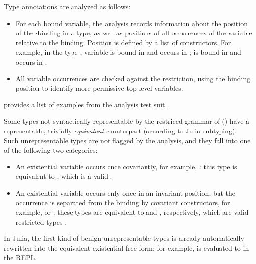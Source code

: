 Type annotations are analyzed as follows:
\begin{itemize}
  \item For each bound variable, the analysis records information about the
    position of the -binding in a type, as well as positions of all
    occurrences of the variable relative to the binding.
    Position is defined by a list of constructors.
    For example, in the type ,
    variable  is bound in \cjl{[]} and occurs in ;
     is bound in \cjl{[Tuple]} and occurs in \cjl{[]}.
  \item All variable occurrences are checked against the restriction,
    using the binding position to identify more permissive top-level variables.
\end{itemize}
 provides a list of examples from 
the analysis test suit.

Some types not syntactically representable by the restriced grammar of \ty
()
have a representable, trivially \emph{equivalent} counterpart (according
to Julia subtyping).
Such unrepresentable types are not flagged by the analysis, and they
fall into one of the following two categories:
\begin{itemize}
  \item An existential variable occurs once covariantly, for example,
    : this type is equivalent to ,
    which is a valid \ty.
  \item An existential variable occurs only once in an invariant position, 
    but the occurrence
    is separated from the binding by covariant constructors, for example,
     or
    : these types are equivalent
    to  and
    , respectively,
    which are valid restricted types \ty.
\end{itemize}
In Julia, the first kind of benign unrepresentable types is already 
automatically rewritten into the equivalent existential-free form: for example,
 is evaluated
to  in the REPL.

